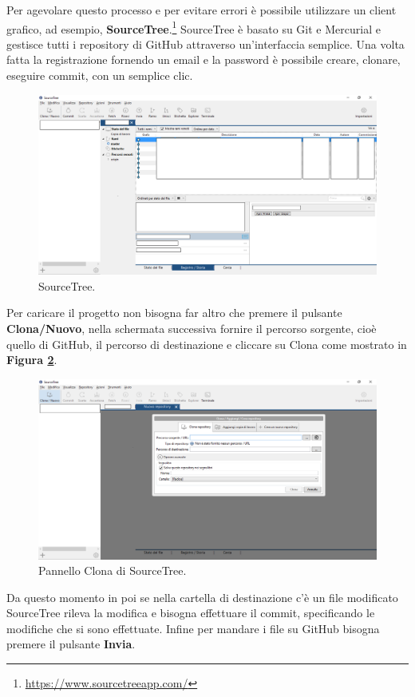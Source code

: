 \documentclass[a4paper,11pt]{article}
\begin{document}
Per agevolare questo processo e per evitare errori è possibile utilizzare un client grafico, ad esempio, \textbf{SourceTree}.\footnote{\url{https://www.sourcetreeapp.com/}}
SourceTree è basato su Git e Mercurial e gestisce tutti i repository di GitHub attraverso un'interfaccia semplice.
Una volta fatta la registrazione fornendo un email e la password è 
possibile creare, clonare, eseguire commit, con un semplice clic.
\begin{figure}[!htpb]
	\centering
	\includegraphics[scale=0.30]{sourcetree.png}
	\caption{SourceTree.}
	\label{fig:14}
\end{figure}
Per caricare il progetto non bisogna far altro che premere il pulsante \textbf{Clona/Nuovo}, nella schermata successiva fornire il percorso sorgente, cioè quello di GitHub, il percorso di destinazione e cliccare su Clona come mostrato in \textbf{Figura \ref{fig:15}}.
\begin{figure}[!htpb]
	\centering
	\includegraphics[scale=0.30]{sourcetree2.png}
	\caption{Pannello Clona di SourceTree.}
	\label{fig:15}
\end{figure}\newpage
Da questo momento in poi se nella cartella di destinazione c'è un file modificato SourceTree rileva la modifica e bisogna effettuare il commit, specificando le modifiche che si sono effettuate. 
Infine per mandare i file su GitHub bisogna premere il pulsante \textbf{Invia}. 
\newpage
\end{document}
